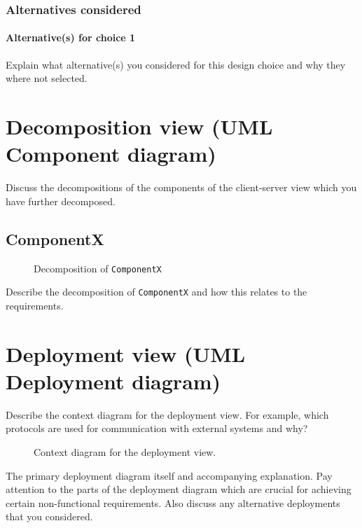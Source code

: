 \documentclass[a4paper,10pt]{article}
\begin{document}
\subsubsection*{Alternatives considered}
\paragraph{Alternative(s) for choice 1} Explain what alternative(s) you
considered for this design choice and why they where not selected.

\section{Decomposition view (UML Component diagram)}\label{sec:decomposition}
Discuss the decompositions of the components of the client-server view which
you have further decomposed.

\subsection{ComponentX}
\begin{figure}[!htp]
    \centering
    \caption{Decomposition of \texttt{ComponentX}}\label{fig:decomp-componentx}
\end{figure}

Describe the decomposition of \texttt{ComponentX} and how this relates to the
requirements.

\section{Deployment view (UML Deployment diagram)}\label{sec:deployment}
Describe the context diagram for the deployment view.
For example, which protocols are used for communication with external systems
and why?

\begin{figure}[!htp]
    \centering
    \caption{Context diagram for the deployment view.}\label{fig:depl_context}
\end{figure}

The primary deployment diagram itself and accompanying explanation.
Pay attention to the parts of the deployment diagram which are crucial for
achieving certain non-functional requirements.
Also discuss any alternative deployments that you considered.
\end{document}
